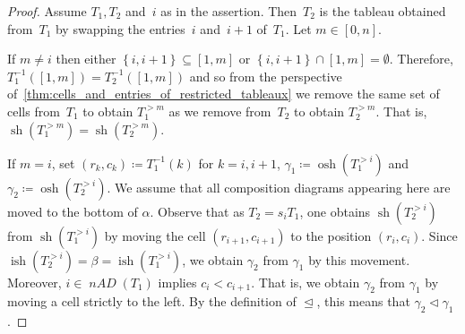 \documentclass[10pt]{amsart}
\theoremstyle{plain}
\theoremstyle{plain}
\theoremstyle{plain}
\theoremstyle{plain}
\theoremstyle{plain}
\theoremstyle{definition}
\theoremstyle{definition}
\newcommand{\nAD}{\operatorname{\mathit{nAD}}}
\DeclareMathOperator{\sh}{sh}
\DeclareMathOperator{\osh}{osh}
\DeclareMathOperator{\ish}{ish}
\newcommand{\set}[1]{\left\{ #1 \right\}}
\newcommand{\fs}{s}
\newcommand{\dleq}{\trianglelefteq}
\newcommand{\dlneq}{\vartriangleleft}
\begin{document}
\begin{proof}
	Assume $T_1,T_2$ and~$i$ as in the assertion. Then~$T_2$ is the tableau obtained from~$T_1$ by swapping the entries~$i$ and~$i+1$ of~$T_1$. Let $m\in[0,n]$.
	 
	If $m\neq i$ then either $\set{i,i+1} \subseteq [1,m]$ or $\set{i,i+1} \cap [1,m]= \emptyset$.
	Therefore, $T_1^{-1}([1,m]) = T_2^{-1} ([1,m])$ and so from the perspective of~\cref{thm:cells_and_entries_of_restricted_tableaux} we remove the same set of cells from~$T_1$ to obtain $T_1^{>m}$ as we remove from~$T_2$ to obtain $T_2^{>m}$. That is,	$\sh(T^{>m}_1) = \sh(T^{>m}_2)$.
	
	If $m = i$, set $(r_k,c_k) \coloneqq T_1^{-1}(k)$ for $k= i,i+1$, $\gamma_1 \coloneqq \osh(T^{>i}_1)$ and $\gamma_2 \coloneqq \osh(T^{>i}_2)$. 
	We assume that all composition diagrams appearing here are moved to the bottom of $\alpha$.
	Observe that as $T_2 = \fs_i T_1$, one obtains $\sh(T^{>i}_2)$ from $\sh(T^{>i}_1)$ by moving the cell $(r_{i+1}, c_{i+1})$ to the position $(r_i,c_i)$. Since $\ish(T^{>i}_2) = \beta = \ish(T^{>i}_1)$, we obtain $\gamma_2$ from $\gamma_1$ by this movement.
	 Moreover, $i\in \nAD(T_1)$ implies $c_i < c_{i+1}$. That is, we obtain $\gamma_2$ from $\gamma_1$ by moving a cell strictly to the left. By the definition of $\dleq$, this means that $\gamma_2 \dlneq \gamma_1$.
\end{proof}
\end{document}
